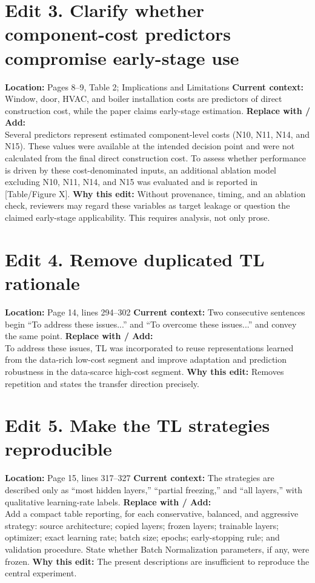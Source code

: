 \documentclass[11pt]{article}
\newcommand{\loc}[1]{\textbf{Location:} #1}
\newcommand{\current}[1]{\textbf{Current context:} #1}
\newcommand{\replacewith}[1]{\textbf{Replace with / Add:}\\{\color{blue}#1}}
\newcommand{\why}[1]{\textbf{Why this edit:} #1}
\begin{document}
\section*{Edit 3. Clarify whether component-cost predictors compromise early-stage use}
\loc{Pages 8--9, Table 2; Implications and Limitations}
\current{Window, door, HVAC, and boiler installation costs are predictors of direct construction cost, while the paper claims early-stage estimation.}
\replacewith{Several predictors represent estimated component-level costs (N10, N11, N14, and N15). These values were available at the intended decision point and were not calculated from the final direct construction cost. To assess whether performance is driven by these cost-denominated inputs, an additional ablation model excluding N10, N11, N14, and N15 was evaluated and is reported in [Table/Figure X].}
\why{Without provenance, timing, and an ablation check, reviewers may regard these variables as target leakage or question the claimed early-stage applicability. This requires analysis, not only prose.}

\section*{Edit 4. Remove duplicated TL rationale}
\loc{Page 14, lines 294--302}
\current{Two consecutive sentences begin ``To address these issues...'' and ``To overcome these issues...'' and convey the same point.}
\replacewith{To address these issues, TL was incorporated to reuse representations learned from the data-rich low-cost segment and improve adaptation and prediction robustness in the data-scarce high-cost segment.}
\why{Removes repetition and states the transfer direction precisely.}

\section*{Edit 5. Make the TL strategies reproducible}
\loc{Page 15, lines 317--327}
\current{The strategies are described only as ``most hidden layers,'' ``partial freezing,'' and ``all layers,'' with qualitative learning-rate labels.}
\replacewith{Add a compact table reporting, for each conservative, balanced, and aggressive strategy: source architecture; copied layers; frozen layers; trainable layers; optimizer; exact learning rate; batch size; epochs; early-stopping rule; and validation procedure. State whether Batch Normalization parameters, if any, were frozen.}
\why{The present descriptions are insufficient to reproduce the central experiment.}
\end{document}
